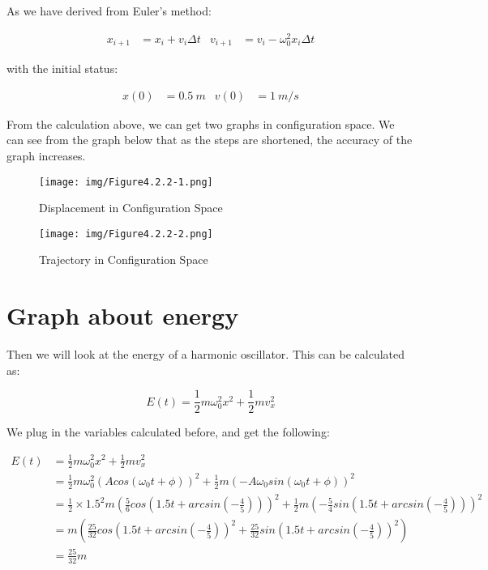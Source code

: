 \documentclass[12pt]{article}
\begin{document}
As we have derived from Euler's method: 

\begin{align}
    x_{i+1} &= x_{i} + v_{i} \Delta t &
    v_{i+1} &= v_{i} - \omega_{0}^2 x_{i} \Delta t \nonumber 
\end{align}

with the initial status: 

\begin{align}
    x(0) &= 0.5 \ m & 
    v(0) &= 1 \ m/s \nonumber 
\end{align}

From the calculation above, we can get two graphs in configuration space. We can see from the graph below that as the steps are shortened, the accuracy of the graph increases. 

\begin{figure}[htb]
    \centering
    \texttt{[image: img/Figure4.2.2-1.png]}
    \caption{Displacement in Configuration Space}
\end{figure} 

\begin{figure}[htb]
    \centering
    \texttt{[image: img/Figure4.2.2-2.png]}
    \caption{Trajectory in Configuration Space}
\end{figure} 

\section{Graph about energy}
Then we will look at the energy of a harmonic oscillator. This can be calculated as: 

\begin{equation}
    E(t) = \frac{1}{2} m \omega_{0}^2 x^2 + \frac{1}{2} m v_{x}^2 
\end{equation}

We plug in the variables calculated before, and get the following: 

\begin{align}
    E(t) &= \frac{1}{2} m \omega_{0}^2 x^2 + \frac{1}{2} m v_{x}^2 \\
         &= \frac{1}{2} m \omega_{0}^2 (A cos( \omega_{0} t + \phi ))^2 + \frac{1}{2} m (-A \omega_{0} sin( \omega_{0} t + \phi ))^2 \nonumber \\
         &= \frac{1}{2} \times 1.5^2 m (\frac{5}{6} cos( 1.5 t + arcsin(-\frac{4}{5}) ))^2 + \frac{1}{2} m (-\frac{5}{4} sin( 1.5 t + arcsin(-\frac{4}{5}) ))^2 \nonumber \\
         &= m\left(\frac{25}{32}cos( 1.5 t + arcsin(-\frac{4}{5}))^2 + \frac{25}{32}sin( 1.5 t + arcsin(-\frac{4}{5}))^2\right) \nonumber \\
         &= \frac{25}{32}m \nonumber
\end{align}
\end{document}
